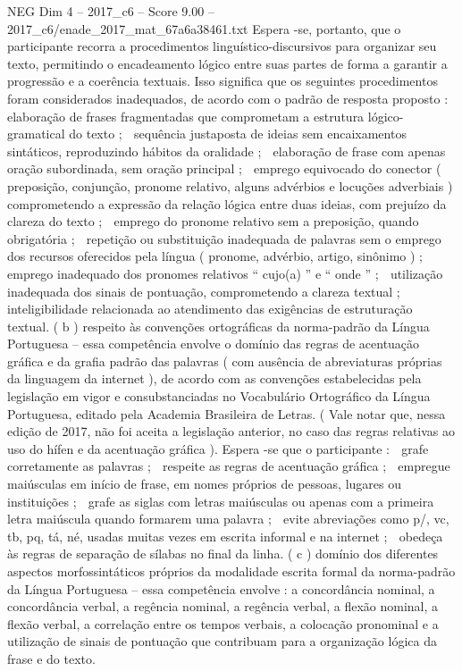 \begin{textsample}{NEG Dim 4 – 2017\_c6 – Score 9.00 – 2017\_c6/enade\_2017\_mat\_67a6a38461.txt}
Espera -se, portanto, que o participante recorra a procedimentos linguístico-discursivos para organizar seu texto, permitindo o encadeamento lógico entre suas partes de forma a garantir a progressão e a coerência textuais.
Isso significa que os seguintes procedimentos foram considerados inadequados, de acordo com o padrão de resposta proposto :  elaboração de frases fragmentadas que comprometam a estrutura lógico-gramatical do texto ;  sequência justaposta de ideias sem encaixamentos sintáticos, reproduzindo hábitos da oralidade ;  elaboração de frase com apenas oração subordinada, sem oração principal ;  emprego equivocado do conector ( preposição, conjunção, pronome relativo, alguns advérbios e locuções adverbiais ) comprometendo a expressão da relação lógica entre duas ideias, com prejuízo da clareza do texto ;  emprego do pronome relativo sem a preposição, quando obrigatória ;  repetição ou substituição inadequada de palavras sem o emprego dos recursos oferecidos pela língua ( pronome, advérbio, artigo, sinônimo ) ;  emprego inadequado dos pronomes relativos “ cujo(a) ” e “ onde ” ;  utilização inadequada dos sinais de pontuação, comprometendo a clareza textual ;  inteligibilidade relacionada ao atendimento das exigências de estruturação textual. ( b ) respeito às convenções ortográficas da norma-padrão da Língua Portuguesa – essa competência envolve o domínio das regras de acentuação gráfica e da grafia padrão das palavras ( com ausência de abreviaturas próprias da linguagem da internet ), de acordo com as convenções estabelecidas pela legislação em vigor e consubstanciadas no Vocabulário Ortográfico da Língua Portuguesa, editado pela Academia Brasileira de Letras. ( Vale notar que, nessa edição de 2017, não foi aceita a legislação anterior, no caso das regras relativas ao uso do hífen e da acentuação gráfica ).
Espera -se que o participante :  grafe corretamente as palavras ;  respeite as regras de acentuação gráfica ;  empregue maiúsculas em início de frase, em nomes próprios de pessoas, lugares ou instituições ;  grafe as siglas com letras maiúsculas ou apenas com a primeira letra maiúscula quando formarem uma palavra ;  evite abreviações como p/, vc, tb, pq, tá, né, usadas muitas vezes em escrita informal e na internet ;  obedeça às regras de separação de sílabas no final da linha. ( c ) domínio dos diferentes aspectos morfossintáticos próprios da modalidade escrita formal da norma-padrão da Língua Portuguesa – essa competência envolve : a concordância nominal, a concordância verbal, a regência nominal, a regência verbal, a flexão nominal, a flexão verbal, a correlação entre os tempos verbais, a colocação pronominal e a utilização de sinais de pontuação que contribuam para a organização lógica da frase e do texto.

\end{textsample}
